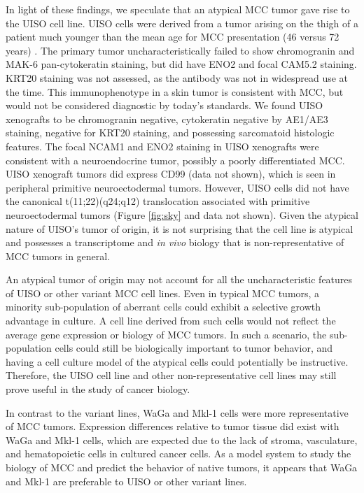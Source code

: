 \documentclass[10pt]{article}
\begin{document}
In light of these findings, we speculate that an atypical MCC tumor gave rise to the UISO cell line.
UISO cells were derived from a tumor arising on the thigh of a patient much younger than the mean age for MCC presentation (46 versus 72 years) \citep{Ronan1993Merkel}.
The primary tumor uncharacteristically failed to show chromogranin and MAK-6 pan-cytokeratin staining, but did have ENO2 and focal CAM5.2 staining.
KRT20 staining was not assessed, as the antibody was not in widespread use at the time.
This immunophenotype in a skin tumor is consistent with MCC, but would not be considered diagnostic by today's standards.
We found UISO xenografts to be chromogranin negative, cytokeratin negative by AE1/AE3 staining, negative for KRT20 staining, and possessing sarcomatoid histologic features.
The focal NCAM1 and ENO2 staining in UISO xenografts were consistent with a neuroendocrine tumor, possibly a poorly differentiated MCC.
UISO xenograft tumors did express CD99 (data not shown), which is seen in peripheral primitive neuroectodermal tumors.
However, UISO cells did not have the canonical t(11;22)(q24;q12) translocation associated with primitive neuroectodermal tumors (Figure \ref{fig:sky} and data not shown)\citep{TurcCarel1988Chromosomes}.
Given the atypical nature of UISO’s tumor of origin, it is not surprising that the cell line is atypical and possesses a transcriptome and \emph{in vivo} biology that is non-representative of MCC tumors in general.

An atypical tumor of origin may not account for all the uncharacteristic features of UISO or other variant MCC cell lines.
Even in typical MCC tumors, a minority sub-population of aberrant cells could exhibit a selective growth advantage in culture.
A cell line derived from such cells would not reflect the average gene expression or biology of MCC tumors.
In such a scenario, the sub-population cells could still be biologically important to tumor behavior, and having a cell culture model of the atypical cells could potentially be instructive.
Therefore, the UISO cell line and other non-representative cell lines may still prove useful in the study of cancer biology.

In contrast to the variant lines, WaGa and Mkl-1 cells were more representative of MCC tumors.
Expression differences relative to tumor tissue did exist with WaGa and Mkl-1 cells, which are expected due to the lack of stroma, vasculature, and hematopoietic cells in cultured cancer cells.
As a model system to study the biology of MCC and predict the behavior of native tumors, it appears that WaGa and Mkl-1 are preferable to UISO or other variant lines.
\end{document}
